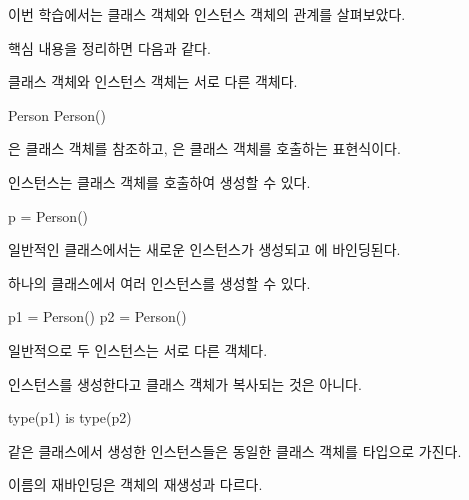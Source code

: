 이번 학습에서는 클래스 객체와 인스턴스 객체의 관계를 살펴보았다.

핵심 내용을 정리하면 다음과 같다.

\begin{dhknote}
\begin{dhksmry}[centered]
클래스 객체와 인스턴스 객체는 서로 다른 객체다.
\end{dhksmry}
\end{dhknote}

\begin{dhkcode}
Person
Person()
\end{dhkcode}

은 클래스 객체를 참조하고, 은 클래스 객체를 호출하는 표현식이다.

\begin{dhknote}
\begin{dhksmry}[centered]
인스턴스는 클래스 객체를 호출하여 생성할 수 있다.
\end{dhksmry}
\end{dhknote}

\begin{dhkcode}
p = Person()
\end{dhkcode}

일반적인 클래스에서는 새로운 인스턴스가 생성되고 에 바인딩된다.

\begin{dhknote}
\begin{dhksmry}[centered]
하나의 클래스에서 여러 인스턴스를 생성할 수 있다.
\end{dhksmry}
\end{dhknote}

\begin{dhkcode}
p1 = Person()
p2 = Person()
\end{dhkcode}

일반적으로 두 인스턴스는 서로 다른 객체다.

\begin{dhknote}
\begin{dhksmry}[centered]
인스턴스를 생성한다고 클래스 객체가 복사되는 것은 아니다.
\end{dhksmry}
\end{dhknote}

\begin{dhkcode}
type(p1) is type(p2)
\end{dhkcode}

같은 클래스에서 생성한 인스턴스들은 동일한 클래스 객체를 타입으로 가진다.

\begin{dhknote}
\begin{dhksmry}[centered]
이름의 재바인딩은 객체의 재생성과 다르다.
\end{dhksmry}
\end{dhknote}

